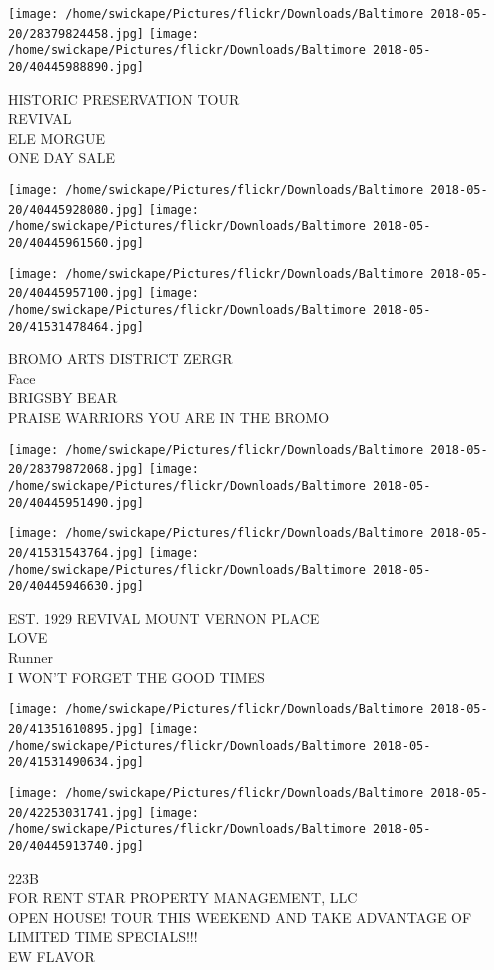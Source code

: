 \documentclass[10pt,letterpaper]{article}
\begin{document}
\texttt{[image: /home/swickape/Pictures/flickr/Downloads/Baltimore 2018-05-20/28379824458.jpg]}
\texttt{[image: /home/swickape/Pictures/flickr/Downloads/Baltimore 2018-05-20/40445988890.jpg]}

HISTORIC PRESERVATION TOUR\\
REVIVAL\\
ELE MORGUE\\
ONE DAY SALE
\pagebreak

\texttt{[image: /home/swickape/Pictures/flickr/Downloads/Baltimore 2018-05-20/40445928080.jpg]}
\texttt{[image: /home/swickape/Pictures/flickr/Downloads/Baltimore 2018-05-20/40445961560.jpg]}

\texttt{[image: /home/swickape/Pictures/flickr/Downloads/Baltimore 2018-05-20/40445957100.jpg]}
\texttt{[image: /home/swickape/Pictures/flickr/Downloads/Baltimore 2018-05-20/41531478464.jpg]}

BROMO ARTS DISTRICT ZERGR\\
Face\\
BRIGSBY BEAR\\
PRAISE WARRIORS YOU ARE IN THE BROMO
\pagebreak

\texttt{[image: /home/swickape/Pictures/flickr/Downloads/Baltimore 2018-05-20/28379872068.jpg]}
\texttt{[image: /home/swickape/Pictures/flickr/Downloads/Baltimore 2018-05-20/40445951490.jpg]}

\texttt{[image: /home/swickape/Pictures/flickr/Downloads/Baltimore 2018-05-20/41531543764.jpg]}
\texttt{[image: /home/swickape/Pictures/flickr/Downloads/Baltimore 2018-05-20/40445946630.jpg]}

EST. 1929 REVIVAL MOUNT VERNON PLACE\\
LOVE\\
Runner\\
I WON'T FORGET THE GOOD TIMES
\pagebreak

\texttt{[image: /home/swickape/Pictures/flickr/Downloads/Baltimore 2018-05-20/41351610895.jpg]}
\texttt{[image: /home/swickape/Pictures/flickr/Downloads/Baltimore 2018-05-20/41531490634.jpg]}

\texttt{[image: /home/swickape/Pictures/flickr/Downloads/Baltimore 2018-05-20/42253031741.jpg]}
\texttt{[image: /home/swickape/Pictures/flickr/Downloads/Baltimore 2018-05-20/40445913740.jpg]}

223B\\
FOR RENT STAR PROPERTY MANAGEMENT, LLC\\
OPEN HOUSE!  TOUR THIS WEEKEND AND TAKE ADVANTAGE OF LIMITED TIME SPECIALS!!!\\
EW FLAVOR
\pagebreak
\end{document}
